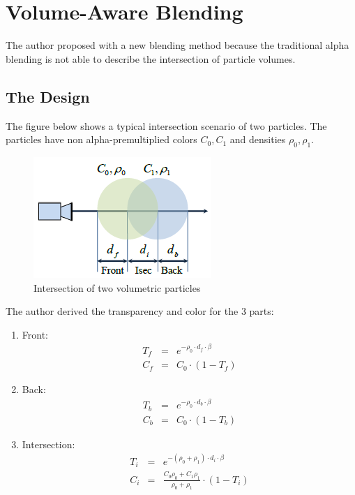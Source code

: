 \section{Volume-Aware Blending}
The author proposed with a new blending method because the traditional alpha blending is not able to describe the intersection of particle volumes.
\subsection{The Design}
The figure below shows a typical intersection scenario of two particles. The particles have non alpha-premultiplied colors $C_0, C_1$ and densities $\rho_0, \rho_1$.

\begin{figure}[htp]
\begin{center}
\includegraphics[scale=1.0]{images/intersection.png}
\caption{Intersection of two volumetric particles}
\label{f15}
\end{center}
\end{figure}

The author derived the transparency and color for the 3 parts:
\begin{enumerate}
\item Front:
\begin{eqnarray}
T_f &=& e^{-\rho_0 \cdot d_f \cdot \beta}\\
C_f &=& C_0 \cdot (1-T_f)
\end{eqnarray}

\item Back:
\begin{eqnarray}
T_b &=& e^{-\rho_0 \cdot d_b \cdot \beta}\\
C_b &=& C_0 \cdot (1-T_b)
\end{eqnarray}

\item Intersection:
\begin{eqnarray}
T_i &=& e^{-(\rho_0+\rho_1) \cdot d_i \cdot \beta}\\
C_i &=& \frac{C_0\rho_0 + C_1\rho_1}{\rho_0+\rho_1} \cdot (1-T_i)
\end{eqnarray}
\end{enumerate}

